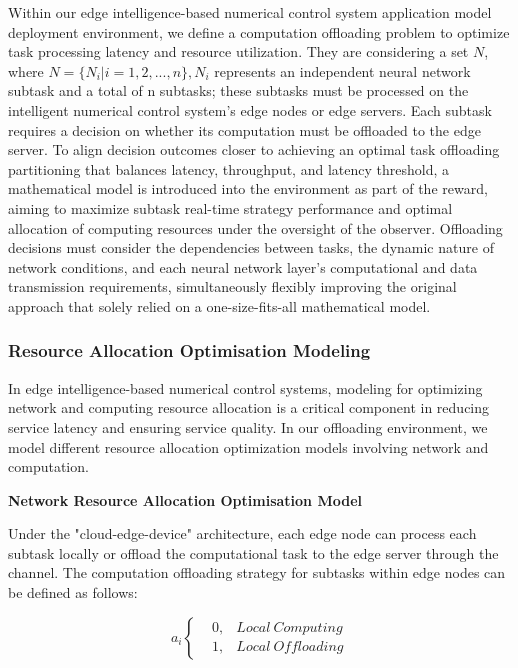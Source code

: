 \documentclass[preprint,12pt,authoryear]{elsarticle}
\begin{document}
Within our edge intelligence-based numerical control system application model deployment environment, we define a computation offloading problem to optimize task processing latency and resource utilization. They are considering a set \(N\), where \(N=\{N_i |i=1,2,...,n\}, N_i\) represents an independent neural network subtask and a total of n subtasks; these subtasks must be processed on the intelligent numerical control system's edge nodes or edge servers. Each subtask requires a decision on whether its computation must be offloaded to the edge server. To align decision outcomes closer to achieving an optimal task offloading partitioning that balances latency, throughput, and latency threshold, a mathematical model is introduced into the environment as part of the reward, aiming to maximize subtask real-time strategy performance and optimal allocation of computing resources under the oversight of the observer. Offloading decisions must consider the dependencies between tasks, the dynamic nature of network conditions, and each neural network layer's computational and data transmission requirements, simultaneously flexibly improving the original approach that solely relied on a one-size-fits-all mathematical model.

\subsubsection{Resource Allocation Optimisation Modeling}

In edge intelligence-based numerical control systems, modeling for optimizing network and computing resource allocation is a critical component in reducing service latency and ensuring service quality. In our offloading environment, we model different resource allocation optimization models involving network and computation.

\textbf{Network Resource Allocation Optimisation Model}

Under the "cloud-edge-device" architecture, each edge node can process each subtask locally or offload the computational task to the edge server through the channel. The computation offloading strategy for subtasks within edge nodes can be defined as follows:

\begin{equation}
    a_i\left\{
        \begin{aligned}
            &0,&Local \ Computing\\
            &1,&Local \ Offloading
        \end{aligned}
    \right.
\end{equation}
\end{document}
